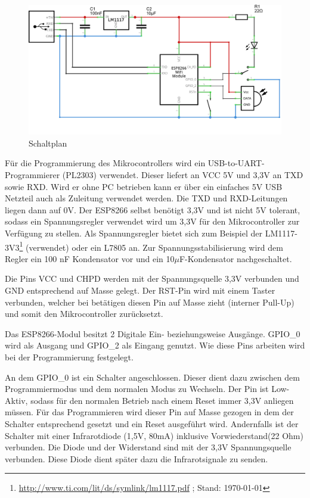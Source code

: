\begin{figure}[h]
	\centering
	\includegraphics[scale=1.4]{Abbildungen/ESP8266_Schaltplan}
	\caption{Schaltplan}
	\label{fig:Schalplan}
\end{figure}

Für die Programmierung des Mikrocontrollers wird ein USB-to-\acs{UART}-Programmierer (PL2303) verwendet.
Dieser liefert an \acs{VCC} 5V und 3,3V an TXD sowie RXD.
Wird er ohne PC betrieben kann er über ein einfaches 5V USB Netzteil auch als Zuleitung verwendet werden. Die \acs{TXD} und \acs{RXD}-Leitungen liegen dann auf 0V.
Der ESP8266 selbst benötigt 3,3V und ist nicht 5V tolerant, sodass ein Spannungsregler verwendet wird um 3,3V für den Mikrocontroller zur Verfügung zu stellen.
Als Spannungsregler bietet sich zum Beispiel der LM1117-3V3\footnote{\url{http://www.ti.com/lit/ds/symlink/lm1117.pdf} ; Stand: \today} (verwendet) oder ein L7805 an.
Zur Spannungsstabilisierung wird dem Regler ein 100 nF Kondensator vor und ein 10$\mu$F-Kondensator nachgeschaltet.

Die Pins \acs{VCC} und \acs{CHPD} werden mit der Spannungsquelle 3,3V verbunden und \ac{GND} entsprechend auf Masse gelegt.
Der \acs{RST}-Pin wird mit einem Taster verbunden, welcher bei betätigen diesen Pin auf Masse zieht (interner Pull-Up) und somit den Mikrocontroller zurücksetzt.

Das ESP8266-Modul besitzt 2 Digitale Ein- beziehungsweise Ausgänge. \acs{GPIO}\_0 wird als Ausgang und \acs{GPIO}\_2 als Eingang genutzt.
Wie diese Pins arbeiten wird bei der Programmierung festgelegt.

An dem {GPIO}\_0 ist ein Schalter angeschlossen.
Dieser dient dazu zwischen dem Programmiermodus und dem normalen Modus zu Wechseln.
Der Pin ist Low-Aktiv, sodass für den normalen Betrieb nach einem Reset immer 3,3V anliegen müssen.
Für das Programmieren wird dieser Pin auf Masse gezogen in dem der Schalter entsprechend gesetzt und ein Reset ausgeführt wird.
Andernfalls ist der Schalter mit einer Infrarotdiode (1,5V, 80mA) inklusive Vorwiederstand(22 Ohm) verbunden.
Die Diode und der Widerstand sind mit der 3,3V Spannungsquelle verbunden.
Diese Diode dient später dazu die Infrarotsignale zu senden.

